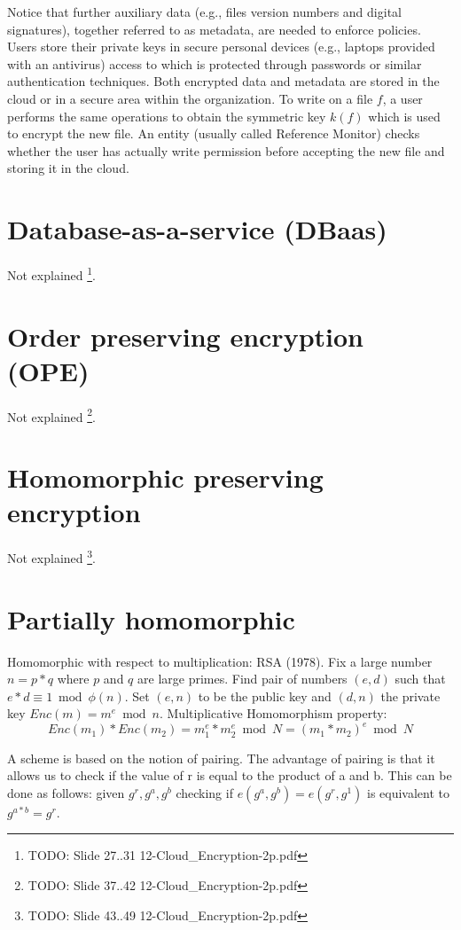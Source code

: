 Notice that further auxiliary data (e.g., files version numbers and digital signatures), together referred to as metadata, are needed to enforce policies. Users store their private keys in secure personal devices (e.g., laptops provided with an antivirus) access to which is protected through passwords or similar authentication techniques. Both encrypted data and metadata are stored in the cloud or in a secure area within the organization. To write on a file $f$, a user performs the same operations to obtain the symmetric key $k(f)$ which is used to encrypt the new file. An entity (usually called Reference Monitor) checks whether the user has actually write permission before accepting the new file and storing it in the cloud.

\section{Database-as-a-service (DBaas)}

Not explained \footnote{TODO: Slide 27..31 12-Cloud\_Encryption-2p.pdf}.


\section{Order preserving encryption (OPE)}

Not explained \footnote{TODO: Slide 37..42 12-Cloud\_Encryption-2p.pdf}.


\section{Homomorphic preserving encryption}

Not explained \footnote{TODO: Slide 43..49 12-Cloud\_Encryption-2p.pdf}.

\section{Partially homomorphic}

Homomorphic with respect to multiplication: RSA (1978). Fix a large number $n=p*q$ where $p$ and $q$ are large primes. Find pair of numbers $(e,d)$ such that $e*d \equiv 1 \bmod \phi(n)$. Set $(e,n)$ to be the public key and $(d,n)$ the private key $Enc(m) = m^e \bmod n$. Multiplicative Homomorphism property:
\[Enc(m_1) * Enc(m_2) = m_1 ^ e * m_2 ^ e \bmod N = (m_1 * m_2)^ e \bmod N\]

A scheme is based on the notion of pairing. The advantage of pairing is that it allows us to check if the value of r is equal to the product of a and b. This can be done as follows: given $g^r, g^a, g^b$ checking if $e(g^a,g^b) = e(g^r, g^1)$ is equivalent to $g^{a*b} = g^r$. 

